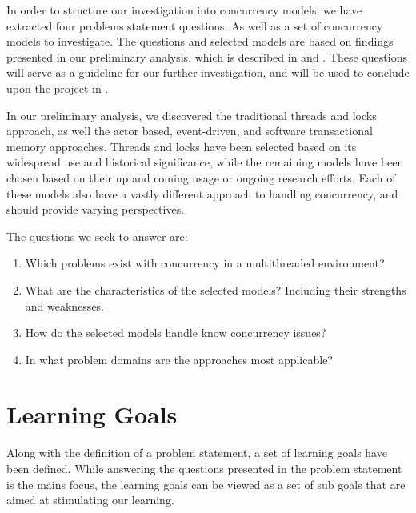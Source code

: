 \makeatletter {}\makeatother
{}
%
In order to structure our investigation into concurrency models, we have extracted four problems statement questions. As well as a set of concurrency models to investigate. The questions and selected models are based on findings presented in our preliminary analysis, which is described in  and . These questions will serve as a guideline for our further investigation, and will be used to conclude upon the project in .

In our preliminary analysis, we discovered the traditional threads and locks approach, as well the actor based, event-driven, and software transactional memory approaches. Threads and locks have been selected based on its widespread use and historical significance, while the remaining models have been chosen based on their up and coming usage or ongoing research efforts. Each of these models also have a vastly different approach to handling concurrency, and should provide varying perspectives.

The questions we seek to answer are:
\begin{enumerate}
\item Which problems exist with concurrency in a multithreaded environment? 
\item What are the characteristics of the selected models? Including their strengths and weaknesses.
\item How do the selected models handle know concurrency issues?
\item In what problem domains are the approaches most applicable?
\end{enumerate}



\section{Learning Goals}
Along with the definition of a problem statement, a set of learning goals have been defined. While answering the questions presented in the problem statement is the mains focus, the learning goals can be viewed as a set of sub goals that are aimed at stimulating our learning.

